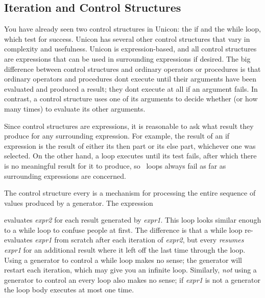 \subsection{Iteration and Control Structures}

You have already seen two control structures in Unicon: the \textsf{if}
and the \textsf{while} loop, which test for success.
Unicon has several other control structures that vary in complexity and
usefulness. Unicon is expression-based, and all control structures are
expressions that can be used in surrounding expressions if desired. The
big difference between control structures and ordinary operators or
procedures is that ordinary operators and procedures
don{\textquotesingle}t execute until their arguments have been
evaluated and produced a result; they don{\textquotesingle}t execute at
all if an argument fails. In contrast, a control structure uses one of
its arguments to decide whether (or how many times) to evaluate its
other arguments.

Since control structures are expressions, it is reasonable to ask what
result they produce for any surrounding expression. For example, the
result of an \textsf{if} expression is the result of either its
\textsf{then} part or its \textsf{else} part, whichever one was
selected. On the other hand, a loop executes until its test fails,
after which there is no meaningful result for it to produce, so \ loops
always fail as far as surrounding expressions are concerned.

The control structure
\textsf{every} is a mechanism for processing the entire
sequence of values produced by a generator. The expression 


\noindent
evaluates \textsf{\textit{expr2}} for each result generated by
\textsf{\textit{expr1}}. This loop looks similar enough to a
\textsf{while} loop to confuse people at first. The difference is that
a \textsf{while} loop re-evaluates \textsf{\textit{expr1}} from scratch
after each iteration of \textsf{\textit{expr2}}, but \textsf{every}
\textit{resumes} \textsf{\textit{expr1}} for an additional result where
it left off the last time through the loop. Using a generator to
control a \textsf{while} loop makes no sense; the generator will
restart each iteration, which may give you an infinite loop. Similarly,
\textit{not} using a generator to control an \textsf{every} loop also
makes no sense; if \textsf{\textit{expr1}} is not a generator the loop
body executes at most one time.

